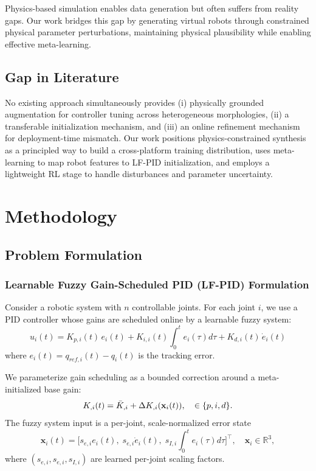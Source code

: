 \documentclass[a4paper]{cas-sc}
\begin{document}
Physics-based simulation \cite{todorov2012mujoco} enables data generation but often suffers from reality gaps. Our work bridges this gap by generating virtual robots through constrained physical parameter perturbations, maintaining physical plausibility while enabling effective meta-learning.

\subsection{Gap in Literature}

No existing approach simultaneously provides (i) physically grounded augmentation for controller tuning across heterogeneous morphologies, (ii) a transferable initialization mechanism, and (iii) an online refinement mechanism for deployment-time mismatch. Our work positions physics-constrained synthesis as a principled way to build a cross-platform training distribution, uses meta-learning to map robot features to LF-PID initialization, and employs a lightweight RL stage to handle disturbances and parameter uncertainty.

\section{Methodology}
\label{sec:methodology}

\subsection{Problem Formulation}

\subsubsection{Learnable Fuzzy Gain-Scheduled PID (LF-PID) Formulation}

Consider a robotic system with $n$ controllable joints. For each joint $i$, we use a PID controller whose gains are scheduled online by a learnable fuzzy system:
\begin{equation}
    u_i(t) = K_{p,i}(t)\, e_i(t) + K_{i,i}(t) \int_0^t e_i(\tau) d\tau + K_{d,i}(t)\, \dot{e}_i(t)
\end{equation}
where $e_i(t) = q_{ref,i}(t) - q_i(t)$ is the tracking error.

We parameterize gain scheduling as a bounded correction around a meta-initialized base gain:
\begin{equation}
    K_{\*,i}(t) = \bar{K}_{\*,i} + \Delta K_{\*,i}(\mathbf{x}_i(t)), \quad \* \in \{p,i,d\}.
\end{equation}
The fuzzy system input is a per-joint, scale-normalized error state
\begin{equation}
    \mathbf{x}_i(t) = \big[s_{e,i} e_i(t),\; s_{\dot e,i} \dot e_i(t),\; s_{I,i} \!\int_0^t e_i(\tau)d\tau\big]^\top,\quad \mathbf{x}_i \in \mathbb{R}^3,
\end{equation}
where $(s_{e,i}, s_{\dot e,i}, s_{I,i})$ are learned per-joint scaling factors.
\end{document}
